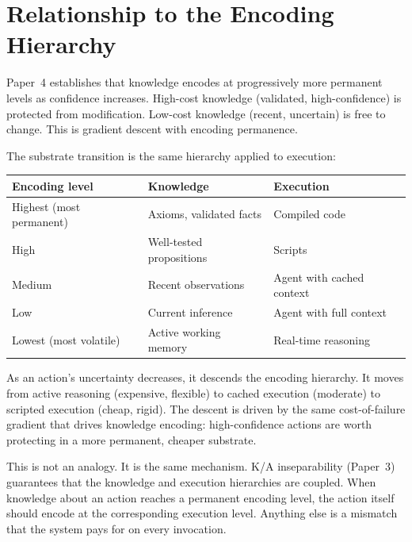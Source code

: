 \documentclass[11pt]{article}
\theoremstyle{definition}
\begin{document}
\section{Relationship to the Encoding Hierarchy}
\label{sec:encoding}

Paper~4 \cite{McCarthy2026d} establishes that knowledge encodes at
progressively more permanent levels as confidence increases. High-cost
knowledge (validated, high-confidence) is protected from modification.
Low-cost knowledge (recent, uncertain) is free to change. This is
gradient descent with encoding permanence.

The substrate transition is the same hierarchy applied to execution:

\begin{center}
\begin{tabular}{lll}
\toprule
\textbf{Encoding level} & \textbf{Knowledge} & \textbf{Execution} \\
\midrule
Highest (most permanent) & Axioms, validated facts & Compiled code \\
High & Well-tested propositions & Scripts \\
Medium & Recent observations & Agent with cached context \\
Low & Current inference & Agent with full context \\
Lowest (most volatile) & Active working memory & Real-time reasoning \\
\bottomrule
\end{tabular}
\end{center}

As an action's uncertainty decreases, it descends the encoding
hierarchy. It moves from active reasoning (expensive, flexible) to
cached execution (moderate) to scripted execution (cheap, rigid).
The descent is driven by the same cost-of-failure gradient that
drives knowledge encoding: high-confidence actions are worth
protecting in a more permanent, cheaper substrate.

This is not an analogy. It is the same mechanism. K/A inseparability
(Paper~3) guarantees that the knowledge and execution hierarchies are
coupled. When knowledge about an action reaches a permanent encoding
level, the action itself should encode at the corresponding execution
level. Anything else is a mismatch that the system pays for on every
invocation.

\end{document}
